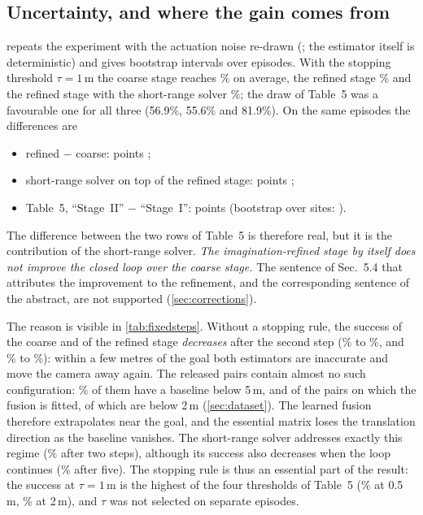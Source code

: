 


\subsection{Uncertainty, and where the gain comes from}
\label{sec:cluncertainty}

 repeats the experiment with the actuation noise re-drawn (\clDrawsText; the estimator itself is deterministic) and gives bootstrap intervals over episodes.\clSpreadText{} With the stopping threshold $\tau{=}1$\,m the coarse stage reaches \clSiSR\% on average, the refined stage \clSiiPlainSR\% and the refined stage with the short-range solver \clSiiSR\%; the draw of Table~5 was a favourable one for all three (56.9\%, 55.6\% and 81.9\%). On the same episodes the differences are
\begin{itemize}[leftmargin=*,itemsep=1pt,topsep=2pt]
\item refined $-$ coarse: \clDrefine{} points \ci{\clDrefineLo}{\clDrefineHi};
\item short-range solver on top of the refined stage: \clDplane{} points \ci{\clDplaneLo}{\clDplaneHi};
\item Table~5, ``Stage~II'' $-$ ``Stage~I'': \clDfull{} points \ci{\clDfullLo}{\clDfullHi} (bootstrap over sites: \ci{\clDfullSiteLo}{\clDfullSiteHi}).
\end{itemize}
The difference between the two rows of Table~5 is therefore real, but it is the contribution of the short-range solver. \emph{The imagination-refined stage by itself does not improve the closed loop over the coarse stage.} The sentence of Sec.~5.4 that attributes the improvement to the refinement, and the corresponding sentence of the abstract, are not supported (\cref{sec:corrections}).

The reason is visible in \cref{tab:fixedsteps}. Without a stopping rule, the success of the coarse and of the refined stage \emph{decreases} after the second step (\clSiFixTwo\% to \clSiFixFive\%, and \clSiiPlainFixTwo\% to \clSiiPlainFixFive\%): within a few metres of the goal both estimators are inaccurate and move the camera away again. The released pairs contain almost no such configuration: \dsShortFive\% of them have a baseline below 5\,m, and \dsFusionShortFive{} of the \dsFusionRows{} pairs on which the fusion is fitted, of which \dsFusionShortTwo{} are below 2\,m (\cref{sec:dataset}). The learned fusion therefore extrapolates near the goal, and the essential matrix loses the translation direction as the baseline vanishes. The short-range solver addresses exactly this regime (\clSiiFixTwo\% after two steps), although its success also decreases when the loop continues (\clSiiFixFive\% after five). The stopping rule is thus an essential part of the result: the success at $\tau{=}1$\,m is the highest of the four thresholds of Table~5 (\clSiiSRhalf\% at 0.5\,m, \clSiiSRtwo\% at 2\,m), and $\tau$ was not selected on separate episodes.


